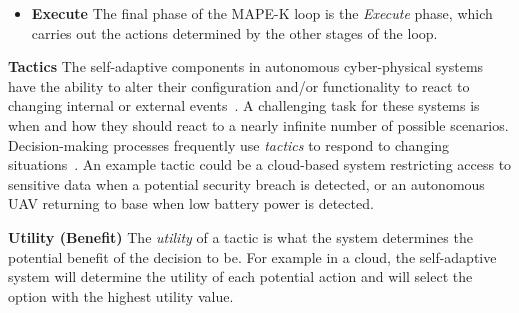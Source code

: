 \documentclass[11pt]{proposalnsf}
\newlength\q %
\begin{document}
\begin{sloppypar}
\begin{itemize}[noitemsep]


\item \textbf{Execute} The final phase of the MAPE-K loop is the \textit{Execute} phase, which carries out the actions determined by the other stages of the loop.


\end{itemize}

\vspace{2mm} \noindent \textbf{Tactics} The self-adaptive components in autonomous cyber-physical systems have the ability to alter their configuration and/or functionality to react to changing internal or external events~\cite{moreno2017decision}. A challenging task for these systems is when and how they should react to a nearly infinite number of possible scenarios. Decision-making processes frequently use \emph{tactics} to respond to changing situations~\cite{moreno2017adaptation}. An example tactic could be a cloud-based system restricting access to sensitive data when a potential security breach is detected, or an autonomous UAV returning to base when low battery power is detected.


\vspace{2mm} \noindent \textbf{Utility (Benefit)} The \emph{utility} of a tactic is what the system determines the potential benefit of the decision to be. For example in a cloud, the self-adaptive system will determine the utility of each potential action and will select the option with the highest utility value.




\end{sloppypar}
\end{document}
